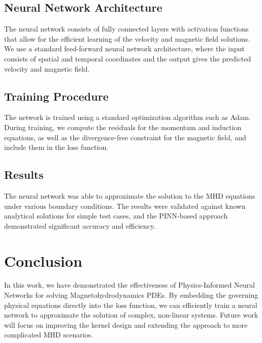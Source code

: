 \documentclass[12pt]{article}
\begin{document}
\subsection{Neural Network Architecture}
The neural network consists of fully connected layers with activation functions that allow for the efficient learning of the velocity and magnetic field solutions. We use a standard feed-forward neural network architecture, where the input consists of spatial and temporal coordinates and the output gives the predicted velocity and magnetic field.

\subsection{Training Procedure}
The network is trained using a standard optimization algorithm such as Adam. During training, we compute the residuals for the momentum and induction equations, as well as the divergence-free constraint for the magnetic field, and include them in the loss function.

\subsection{Results}
The neural network was able to approximate the solution to the MHD equations under various boundary conditions. The results were validated against known analytical solutions for simple test cases, and the PINN-based approach demonstrated significant accuracy and efficiency.

\section{Conclusion}
In this work, we have demonstrated the effectiveness of Physics-Informed Neural Networks for solving Magnetohydrodynamics PDEs. By embedding the governing physical equations directly into the loss function, we can efficiently train a neural network to approximate the solution of complex, non-linear systems. Future work will focus on improving the kernel design and extending the approach to more complicated MHD scenarios.




\end{document}
